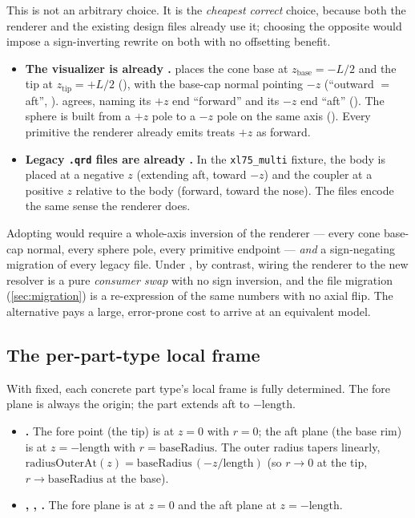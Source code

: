This is not an arbitrary choice. It is the \emph{cheapest correct} choice, because both the
renderer and the existing design files already use it; choosing the opposite would impose a
sign-inverting rewrite on both with no offsetting benefit.

\begin{itemize}
  \item \textbf{The visualizer is already \zfwd{}.}  places the cone base at
  $z_{\text{base}} = -L/2$ and the tip at $z_{\text{tip}} = +L/2$
  (), with the base-cap normal pointing $-z$ (``outward
  $=$ aft'', ).  agrees, naming its
  $+z$ end ``forward'' and its $-z$ end ``aft'' (). The
  sphere is built from a $+z$ pole to a $-z$ pole on the same axis
  (). Every primitive the renderer already emits treats
  $+z$ as forward.
  \item \textbf{Legacy \texttt{.qrd} files are already \zfwd{}.} In the
  \texttt{xl75\_multi} fixture, the body is placed at a negative $z$ (extending aft, toward
  $-z$) and the coupler at a positive $z$ relative to the body (forward, toward the nose).
  The files encode the same sense the renderer does.
\end{itemize}

\begin{rejected}[$+z = $ aft]
Adopting \zaft{} would require a whole-axis inversion of the renderer --- every cone
base-cap normal, every sphere pole, every primitive endpoint --- \emph{and} a sign-negating
migration of every legacy file. Under \zfwd{}, by contrast, wiring the renderer to the new
resolver is a pure \emph{consumer swap} with no sign inversion, and the file migration
(\cref{sec:migration}) is a re-expression of the same numbers with no axial flip. The
alternative pays a large, error-prone cost to arrive at an equivalent model.
\end{rejected}

\subsection{The per-part-type local frame}

With \zfwd{} fixed, each concrete part type's local frame is fully determined. The fore plane
is always the origin; the part extends aft to $-\text{length}$.

\begin{itemize}
  \item \textbf{.} The fore point (the tip) is at $z = 0$ with $r = 0$;
  the aft plane (the base rim) is at $z = -\text{length}$ with $r = \text{baseRadius}$.
  The outer radius tapers linearly,
  $\text{radiusOuterAt}(z) = \text{baseRadius}\,(-z/\text{length})$
  (so $r \to 0$ at the tip, $r \to \text{baseRadius}$ at the base).
  \item \textbf{, , .} The fore plane is at
  $z = 0$ and the aft plane at $z = -\text{length}$.
\end{itemize}

